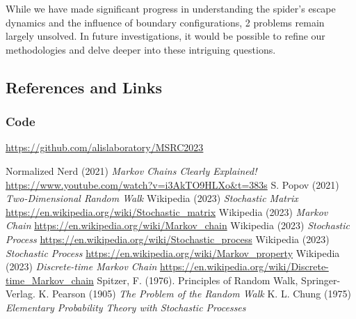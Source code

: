 \documentclass[12pt,a4paper]{article}
\begin{document}
While we have made significant progress in understanding the spider's escape dynamics and the influence of boundary configurations, 2 problems remain largely unsolved. In future investigations, it would be possible to refine our methodologies and delve deeper into these intriguing questions.

\subsection{References and Links}

\subsubsection{Code}
\url{https://github.com/alislaboratory/MSRC2023}


\begin{thebibliography}{9}
Normalized Nerd (2021) \emph{Markov Chains Clearly Explained!} \url{https://www.youtube.com/watch?v=i3AkTO9HLXo&t=383s}
S. Popov (2021) \emph{Two-Dimensional Random Walk}
Wikipedia (2023) \emph{Stochastic Matrix} \url{https://en.wikipedia.org/wiki/Stochastic_matrix}
Wikipedia (2023) \emph{Markov Chain} \url{https://en.wikipedia.org/wiki/Markov_chain}
Wikipedia (2023) \emph{Stochastic Process} \url{https://en.wikipedia.org/wiki/Stochastic_process}
Wikipedia (2023) \emph{Stochastic Process} \url{https://en.wikipedia.org/wiki/Markov_property}
Wikipedia (2023) \emph{Discrete-time Markov Chain} \url{https://en.wikipedia.org/wiki/Discrete-time_Markov_chain}
Spitzer, F. (1976). Principles of Random Walk, Springer-Verlag.
K. Pearson (1905) \emph{The Problem of the Random Walk}
K. L. Chung (1975) \emph{Elementary Probability Theory with Stochastic Processes}
\end{thebibliography}
\end{document}
